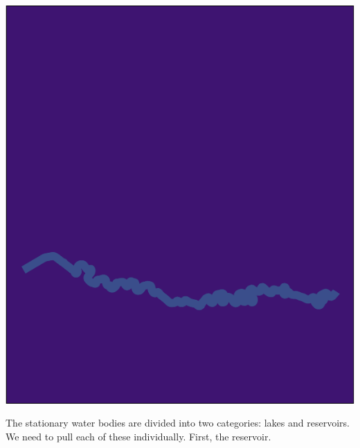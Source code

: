 \documentclass[
  paper=a4,
  ,captions=tableheading
]{scrartcl}
\begin{document}
\includegraphics{Haskell_files/figure-latex/unnamed-chunk-22-1.pdf}

The stationary water bodies are divided into two categories: lakes and
reservoirs. We need to pull each of these individually. First, the
reservoir.
\end{document}
